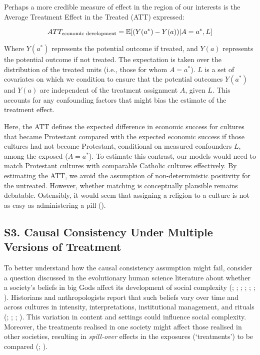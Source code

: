 \documentclass[
  single column]{article}
\begin{document}
Perhaps a more credible measure of effect in the region of our interests
is the Average Treatment Effect in the Treated (ATT) expressed:

\[
ATT_{\textnormal{economic~development}} = \mathbb{E}[(Y(a^*) - Y(a))|A = a^*,L]
\]

Where \(Y(a^*)\) represents the potential outcome if treated, and
\(Y(a)\) represents the potential outcome if not treated. The
expectation is taken over the distribution of the treated units (i.e.,
those for whom \(A = a^*\)). \(L\) is a set of covariates on which we
condition to ensure that the potential outcomes \(Y(a^*)\) and \(Y(a)\)
are independent of the treatment assignment \(A\), given \(L\). This
accounts for any confounding factors that might bias the estimate of the
treatment effect.

Here, the ATT defines the expected difference in economic success for
cultures that became Protestant compared with the expected economic
success if those cultures had not become Protestant, conditional on
measured confounders \(L\), among the exposed (\(A = a^*\)). To estimate
this contrast, our models would need to match Protestant cultures with
comparable Catholic cultures effectively. By estimating the ATT, we
avoid the assumption of non-deterministic positivity for the untreated.
However, whether matching is conceptually plausible remains debatable.
Ostensibly, it would seem that assigning a religion to a culture is not
as easy as administering a pill ().

\newpage{}

\subsection{S3. Causal Consistency Under Multiple Versions of
Treatment}\label{id-app-c}

To better understand how the causal consistency assumption might fail,
consider a question discussed in the evolutionary human science
literature about whether a society's beliefs in big Gods affect its
development of social complexity (; ;
;
;
;
;
). Historians and
anthropologists report that such beliefs vary over time and across
cultures in intensity, interpretations, institutional management, and
rituals (;
;
;
). This variation in content
and settings could influence social complexity. Moreover, the treatments
realised in one society might affect those realised in other societies,
resulting in \emph{spill-over} effects in the exposures (`treatments')
to be compared (;
).
\end{document}
